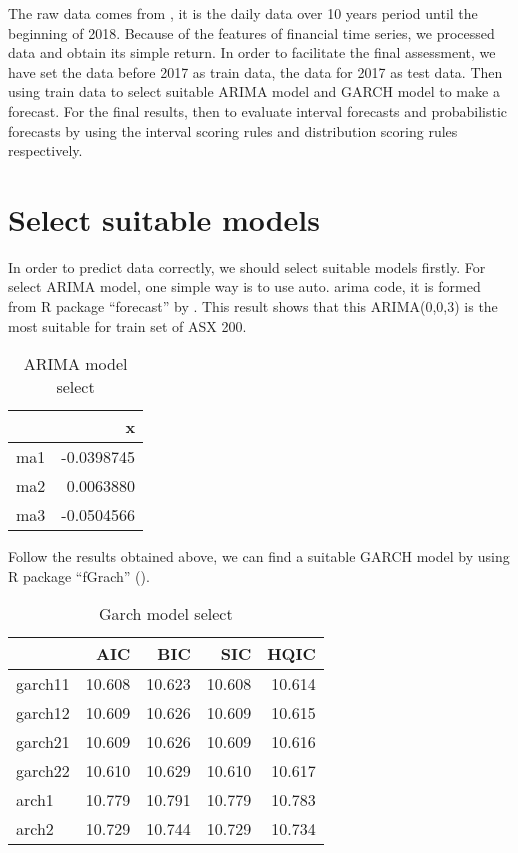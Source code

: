 \documentclass{monashthesis}
\theoremstyle{definition}
\theoremstyle{definition}
\theoremstyle{definition}
\theoremstyle{remark}
\begin{document}
The raw data comes from \textcite{YH}, it is the daily data over 10
years period until the beginning of 2018. Because of the features of
financial time series, we processed data and obtain its simple return.
In order to facilitate the final assessment, we have set the data before
2017 as train data, the data for 2017 as test data. Then using train
data to select suitable ARIMA model and GARCH model to make a forecast.
For the final results, then to evaluate interval forecasts and
probabilistic forecasts by using the interval scoring rules and
distribution scoring rules respectively.

\section{Select suitable models}\label{select-suitable-models}

In order to predict data correctly, we should select suitable models
firstly. For select ARIMA model, one simple way is to use auto. arima
code, it is formed from R package ``forecast'' by \textcite{RH181}. This
result shows that this ARIMA(0,0,3) is the most suitable for train set
of ASX 200.

\begin{table}

\caption{\label{tab:modelselect1}ARIMA model select}
\centering
\begin{tabular}[t]{lr}
\toprule
  & x\\
\midrule
ma1 & -0.0398745\\
ma2 & 0.0063880\\
ma3 & -0.0504566\\
\bottomrule
\end{tabular}
\end{table}

Follow the results obtained above, we can find a suitable GARCH model by
using R package ``fGrach'' (\textcite{WD17}).

\begin{table}

\caption{\label{tab:table1}Garch model select}
\centering
\begin{tabular}[t]{lrrrr}
\toprule
  & AIC & BIC & SIC & HQIC\\
\midrule
garch11 & 10.608 & 10.623 & 10.608 & 10.614\\
garch12 & 10.609 & 10.626 & 10.609 & 10.615\\
garch21 & 10.609 & 10.626 & 10.609 & 10.616\\
garch22 & 10.610 & 10.629 & 10.610 & 10.617\\
arch1 & 10.779 & 10.791 & 10.779 & 10.783\\
arch2 & 10.729 & 10.744 & 10.729 & 10.734\\
\bottomrule
\end{tabular}
\end{table}
\end{document}
